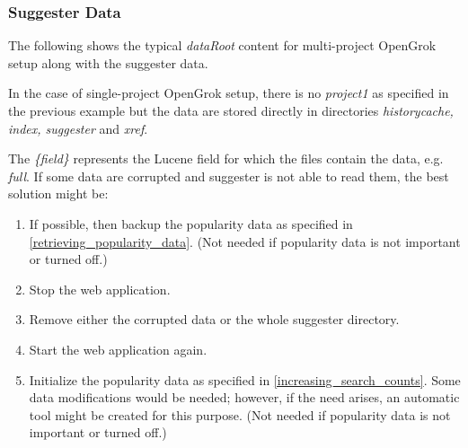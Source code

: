 \subsubsection{Suggester Data}
The following shows the typical \textit{dataRoot} content for multi-project OpenGrok setup along with the suggester data.

In the case of single-project OpenGrok setup, there is no \textit{project1} as specified in the previous example but the
data are stored directly in directories \textit{historycache, index, suggester} and \textit{xref}.

The \textit{\{field\}} represents the Lucene field for which the files contain the data, e.g. \textit{full}.
If some data are corrupted and
suggester is not able to read them, the best solution might be:
\begin{enumerate}
    \item If possible, then backup the popularity data as specified in \ref{retrieving_popularity_data}. (Not needed
    if popularity data is not important or turned off.)
    \item Stop the web application.
    \item Remove either the corrupted data or the whole suggester directory.
    \item Start the web application again.
    \item Initialize the popularity data as specified in \ref{increasing_search_counts}. Some data modifications would
    be needed; however, if the need arises, an automatic tool might be created for this purpose. (Not needed
    if popularity data is not important or turned off.)
\end{enumerate}

